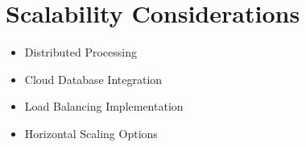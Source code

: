 \documentclass[11pt,a4paper]{report}
\begin{document}
\section{Scalability Considerations}
\begin{itemize}
    \item Distributed Processing
    \item Cloud Database Integration
    \item Load Balancing Implementation
    \item Horizontal Scaling Options
\end{itemize}
\end{document}
